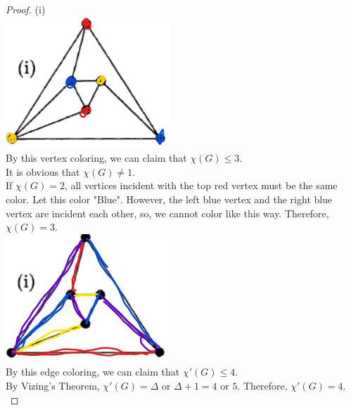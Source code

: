 \documentclass[a4paper, 12pt]{article}
\begin{document}
\begin{proof}

(i) \\
\includegraphics[width=0.25\linewidth]{image2.png} \\
By this vertex coloring, we can claim that $\chi (G) \leq 3$. \\
It is obvious that $\chi (G) \neq 1$. \\
If $\chi (G) = 2$, all vertices incident with the top red vertex must be the same color. Let this color "Blue". However, the left blue vertex and the right blue vertex are incident each other, so, we cannot color like this way. Therefore, $\chi (G) = 3$. \\
\includegraphics[width=0.25\linewidth]{image3.png} \\
By this edge coloring, we can claim that $\chi '(G) \leq 4$.\\ 
By Vizing's Theorem, $\chi '(G) = \Delta \textrm{ or } \Delta + 1 = 4 \textrm{ or } 5$. Therefore, $\chi '(G) = 4$. \\


\end{proof}
\end{document}
